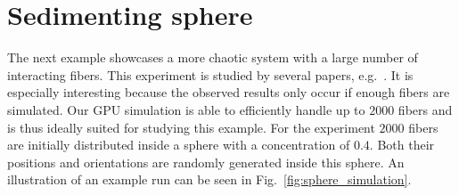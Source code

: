 \section{Sedimenting sphere}
\label{sec:example_sphere}

The next example showcases a more chaotic system with a large number of interacting fibers. This experiment is studied by several papers, e.g.~\cite{Metzger2007}\cite{Park2010}\cite{Bulow2015}. It is especially interesting because the observed results only occur if enough fibers are simulated. Our GPU simulation is able to efficiently handle up to $2000$ fibers and is thus ideally suited for studying this example. For the experiment $2000$ fibers are initially distributed inside a sphere with a concentration of $0.4$. Both their positions and orientations are randomly generated inside this sphere. An illustration of an example run can be seen in Fig.~\ref{fig:sphere_simulation}.

